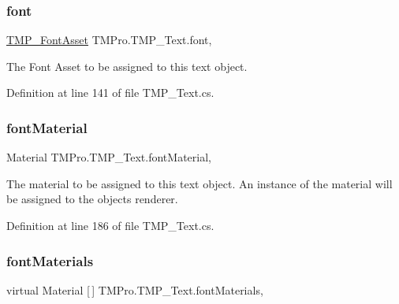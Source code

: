 \mbox{\label{class_t_m_pro_1_1_t_m_p___text_a0a55f0d5dc209d8b265113c2669fd980}} 
\subsubsection{\texorpdfstring{font}{font}}
{\footnotesize\ttfamily \mbox{\hyperlink{class_t_m_pro_1_1_t_m_p___font_asset}{T\+M\+P\+\_\+\+Font\+Asset}} T\+M\+Pro.\+T\+M\+P\+\_\+\+Text.\+font\hspace{0.3cm}{\ttfamily [get]}, {\ttfamily [set]}}



The Font Asset to be assigned to this text object. 



Definition at line 141 of file T\+M\+P\+\_\+\+Text.\+cs.

\mbox{\label{class_t_m_pro_1_1_t_m_p___text_a43469e73ada24bcd98556df734ed3062}} 
\subsubsection{\texorpdfstring{fontMaterial}{fontMaterial}}
{\footnotesize\ttfamily Material T\+M\+Pro.\+T\+M\+P\+\_\+\+Text.\+font\+Material\hspace{0.3cm}{\ttfamily [get]}, {\ttfamily [set]}}



The material to be assigned to this text object. An instance of the material will be assigned to the object\textquotesingle{}s renderer. 



Definition at line 186 of file T\+M\+P\+\_\+\+Text.\+cs.

\mbox{\label{class_t_m_pro_1_1_t_m_p___text_a9fdf319f4f5ef63d80c9a575472d800f}} 
\subsubsection{\texorpdfstring{fontMaterials}{fontMaterials}}
{\footnotesize\ttfamily virtual Material \mbox{[}$\,$\mbox{]} T\+M\+Pro.\+T\+M\+P\+\_\+\+Text.\+font\+Materials\hspace{0.3cm}{\ttfamily [get]}, {\ttfamily [set]}}



